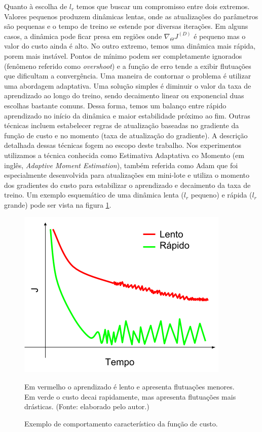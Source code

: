 Quanto à escolha de $l_r$ temos que buscar um compromisso entre dois extremos. Valores pequenos produzem dinâmicas lentas, onde as atualizações do parâmetros são pequenas e o tempo de treino se estende por diversas iterações. Em alguns casos, a dinâmica pode ficar presa em regiões onde $\nabla_{\Theta} J^{(D)}$ é pequeno mas o valor do custo ainda é alto. No outro extremo, temos uma dinâmica mais rápida, porem mais instável. Pontos de mínimo podem ser completamente ignorados (fenômeno referido como \textit{overshoot}) e a função de erro tende a exibir flutuações que dificultam a convergência. Uma maneira de contornar o problema é utilizar uma abordagem adaptativa. Uma solução simples é diminuir o valor da taxa de aprendizado ao longo do treino, sendo decaimento linear ou exponencial duas escolhas bastante comuns. Dessa forma, temos um balanço entre rápido aprendizado no início da dinâmica e maior estabilidade próximo ao fim. Outras técnicas incluem estabelecer regras de atualização baseadas no gradiente da função de custo e no momento (taxa de atualização do gradiente). A descrição detalhada dessas técnicas fogem ao escopo deste trabalho. Nos experimentos utilizamos a técnica conhecida como Estimativa Adaptativa co Momento (em inglês, \textit{Adaptive Moment Estimation}), também referida como Adam \cite{adam_op} que foi especialmente desenvolvida para atualizações em mini-lote e utiliza o momento dos gradientes do custo para estabilizar o aprendizado e decaimento da taxa de treino. Um exemplo esquemático de uma dinâmica lenta ($l_r$ pequeno) e rápida ($l_r$ grande) pode ser vista na figura \ref{convergence}.

\begin{figure}[ht]
	\caption{Exemplo de comportamento característico da função de custo.}
	\begin{center}
	\includegraphics[width=.6\linewidth]{figuras/convergence.png}
	\end{center}
	\small Em vermelho o aprendizado é lento e apresenta flutuações menores. Em verde o custo decai rapidamente, mas apresenta flutuações mais drásticas. (Fonte: elaborado pelo autor.)
	\label{convergence}
\end{figure}


